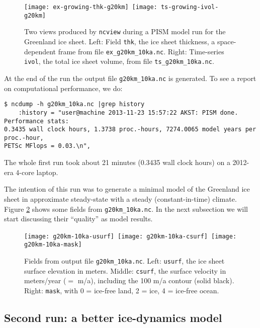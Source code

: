 \begin{figure}[ht]
\centering
\mbox{\texttt{[image: ex-growing-thk-g20km]}
  \qquad \texttt{[image: ts-growing-ivol-g20km]}}
\caption{Two views produced by \texttt{ncview} during a PISM model run for the Greenland ice sheet.  Left: Field \texttt{thk}, the ice sheet thickness, a space-dependent frame from file \texttt{ex_g20km_10ka.nc}.  Right: Time-series \texttt{ivol}, the total ice sheet volume, from file \texttt{ts_g20km_10ka.nc}. }
\label{fig:growing}
\end{figure}

At the end of the run the output file \texttt{g20km_10ka.nc} is generated.  To see a report on computational  performance, we do:
\begin{verbatim}
$ ncdump -h g20km_10ka.nc |grep history
    :history = "user@machine 2013-11-23 15:57:22 AKST: PISM done.  Performance stats:
0.3435 wall clock hours, 1.3738 proc.-hours, 7274.0065 model years per proc.-hour,
PETSc MFlops = 0.03.\n",
\end{verbatim}
The whole first run took about 21 minutes (0.3435 wall clock hours) on a 2012-era 4-core laptop.

The intention of this run was to generate a minimal model of the Greenland ice sheet in approximate steady-state with a steady (constant-in-time) climate.  Figure \ref{fig:firstoutput} shows some fields from \texttt{g20km_10ka.nc}.  In the next subsection  we will start discussing their ``quality'' as model results.

\begin{figure}[ht]
\centering
\mbox{\texttt{[image: g20km-10ka-usurf]} \texttt{[image: g20km-10ka-csurf]} \texttt{[image: g20km-10ka-mask]}}
\caption{Fields from output file \texttt{g20km_10ka.nc}.  Left: \texttt{usurf}, the ice sheet surface elevation in meters.  Middle: \texttt{csurf}, the surface velocity in meters/year ($=$ m/a), including the 100 m/a contour (solid black).  Right: \texttt{mask}, with 0 = ice-free land, 2 = ice, 4 = ice-free ocean.}
\label{fig:firstoutput}
\end{figure}


\subsection{Second run: a better ice-dynamics model}  \label{subsect:ssarun}  

